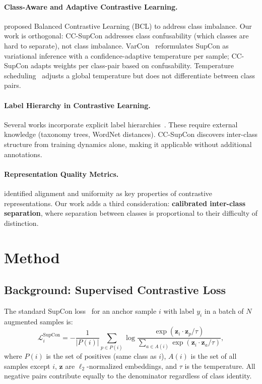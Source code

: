 \documentclass{article}
\newcommand{\bz}{\mathbf{z}}
\begin{document}
\paragraph{Class-Aware and Adaptive Contrastive Learning.}
\citet{zhu2022balanced} proposed Balanced Contrastive Learning (BCL) to address class imbalance. Our work is orthogonal: CC-SupCon addresses class confusability (which classes are hard to separate), not class imbalance. VarCon~\citep{wang2025varcon} reformulates SupCon as variational inference with a confidence-adaptive temperature per sample; CC-SupCon adapts weights per class-pair based on confusability. Temperature scheduling~\citep{kukleva2023temperature} adjusts a global temperature but does not differentiate between class pairs.

\paragraph{Label Hierarchy in Contrastive Learning.}
Several works incorporate explicit label hierarchies~\citep{zhang2022use}. These require external knowledge (taxonomy trees, WordNet distances). CC-SupCon discovers inter-class structure from training dynamics alone, making it applicable without additional annotations.

\paragraph{Representation Quality Metrics.}
\citet{wang2020understanding} identified alignment and uniformity as key properties of contrastive representations. Our work adds a third consideration: \textbf{calibrated inter-class separation}, where separation between classes is proportional to their difficulty of distinction.


\section{Method}
\label{sec:method}

\subsection{Background: Supervised Contrastive Loss}

The standard SupCon loss~\citep{khosla2020supervised} for an anchor sample $i$ with label $y_i$ in a batch of $N$ augmented samples is:
\begin{equation}
\mathcal{L}_i^{\text{SupCon}} = -\frac{1}{|P(i)|} \sum_{p \in P(i)} \log \frac{\exp(\bz_i \cdot \bz_p / \tau)}{\sum_{a \in A(i)} \exp(\bz_i \cdot \bz_a / \tau)},
\label{eq:supcon}
\end{equation}
where $P(i)$ is the set of positives (same class as $i$), $A(i)$ is the set of all samples except $i$, $\bz$ are $\ell_2$-normalized embeddings, and $\tau$ is the temperature. All negative pairs contribute equally to the denominator regardless of class identity.
\end{document}
